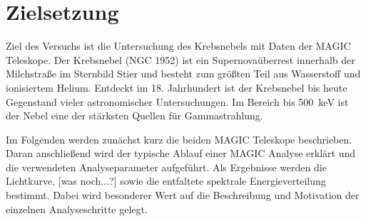 \section{Zielsetzung}
\label{sec:zielsetzung}

Ziel des Versuchs ist die Untersuchung des Krebsnebels mit Daten der MAGIC
Teleskope. Der Krebsnebel (NGC 1952) ist ein Supernovaüberrest innerhalb der
Milchstraße im Sternbild Stier und besteht zum größten Teil aus Wasserstoff und
ionisiertem Helium. Entdeckt im 18. Jahrhundert ist der Krebsnebel bis heute
Gegenstand vieler astronomischer Untersuchungen. Im Bereich bis
\SI{500}{\kilo\electronvolt} ist der Nebel eine der stärksten Quellen für
Gammastrahlung.

Im Folgenden werden zunächst kurz die beiden MAGIC Teleskope beschrieben. Daran
anschließend wird der typische Ablauf einer MAGIC Analyse erklärt und die
verwendeten Analyseparameter aufgeführt. Als Ergebnisse werden die Lichtkurve,
[was noch...?] sowie die entfaltete spektrale Energieverteilung bestimmt. Dabei
wird besonderer Wert auf die Beschreibung und Motivation der einzelnen
Analyseschritte gelegt.

